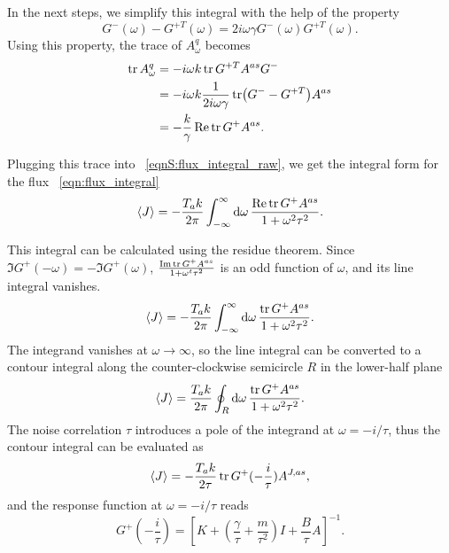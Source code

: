 \documentclass[
 amsmath,amssymb,
 aps,
 pre,
 longbibliography,
 10pt, onecolumn,
 notitlepage
]{revtex4-1}
\begin{document}
In the next steps, we simplify this integral with the help of the property \cite{Kundu2011LargeDeviations}
\begin{equation} \label{eqnS:response_property}
G^-(\omega) - G^{+T}(\omega) = 2i\omega\gamma G^-(\omega)G^{+T}(\omega) .
\end{equation}
Using this property, the trace of $A_\omega^q$ becomes
\begin{equation}
\begin{split}
\tr A_\omega^q &= -i\omega k \tr G^{+T} A^{as} G^- \\
&= -i\omega k \frac{1}{2i\omega \gamma} \tr (G^- - G^{+T})A^{as} \\
&= -\frac{k}{\gamma} \Re\tr G^+A^{as} .
\end{split}
\end{equation}

Plugging this trace into \eqnname~\eqref{eqnS:flux_integral_raw}, we get the integral form for the flux \eqnname~\eqref{eqn:flux_integral}
\begin{equation}
\expval{J} = -\frac{T_ak}{2\pi} \int_{-\infty}^{\infty} \dd{\omega} \frac{\Re \tr G^+A^{as}}{1+\omega^2\tau^2} .
\end{equation}

This integral can be calculated using the residue theorem.
Since $\Im G^+(-\omega) = -\Im G^+(\omega)$,
$\frac{\Im \tr G^+A^{as}}{1+\omega^t\tau^2}$ is an odd function of
$\omega$, and its line integral vanishes.
\begin{equation}
\expval{J} = -\frac{T_ak}{2\pi} \int_{-\infty}^{\infty} \dd{\omega} \frac{\tr G^+A^{as}}{1+\omega^2\tau^2} .
\end{equation}
The integrand vanishes at $\omega \rightarrow \infty$, so the line
integral can be converted to a contour integral along the
counter-clockwise semicircle $R$ in the lower-half plane
\begin{equation}
\expval{J} = \frac{T_ak}{2\pi} \oint_R \dd{\omega} \frac{\tr G^+A^{as}}{1+\omega^2\tau^2} .
\end{equation}
The noise correlation $\tau$ introduces a pole of the integrand at $\omega=-i/\tau$, thus the contour integral can be evaluated as
\begin{equation} \label{eqnS:flux_residue}
\expval{J} = -\frac{T_ak}{2\tau} \tr G^+(-\frac{i}{\tau})A^{J,as} ,
\end{equation}
and the response function at $\omega=-i/\tau$ reads
\begin{equation} \label{eqnS:response_at_pole}
G^+(-\frac{i}{\tau})
= [K + (\frac{\gamma}{\tau} + \frac{m}{\tau^2})I + \frac{B}{\tau}A]^{-1} .
\end{equation}
\end{document}
